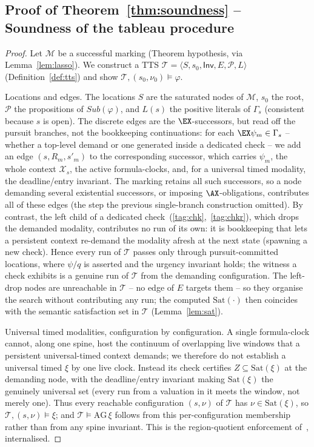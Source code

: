 \subsection{Proof of Theorem~\ref{thm:soundness} -- Soundness of the tableau procedure}

\begin{proof}
Let $\mathcal{M}$ be a successful marking (Theorem hypothesis, via Lemma~\ref{lem:lasso}). We construct a TTS $\mathcal{T}=\langle S,s_0,\mathsf{Inv},E,\mathcal{P},L\rangle$ (Definition~\ref{def:tts}) and show $\mathcal{T},(s_0,\nu_0)\models\varphi$.

{Locations and edges.} The locations $S$ are the saturated nodes of $\mathcal{M}$, $s_0$ the root, $\mathcal{P}$ the propositions of $Sub(\varphi)$, and $L(s)$ the positive literals of $\Gamma_s$ (consistent because $s$ is open). The discrete edges are the $\EX$-successors, but read off the {pursuit} branches, not the bookkeeping continuations: for each $\EX\psi_m\in\Gamma_s$ -- whether a top-level demand or one generated inside a dedicated check -- we add an edge $(s,R_m,s'_m)$ to the corresponding successor, which carries $\psi_m$, the whole context $\mathcal{X}_s$, the active formula-clocks, and, for a universal timed modality, the deadline/entry invariant. The marking retains {all} such successors, so a node demanding several existential successors, or imposing $\AX$-obligations, contributes all of these edges (the step the previous single-branch construction omitted). By contrast, the left child of a dedicated check~(\ref{tag:chk},~\ref{tag:chkr}), which {drops} the demanded modality, contributes {no run of its own}: it is bookkeeping that lets a persistent context re-demand the modality afresh at the next state (spawning a new check). Hence every run of $\mathcal{T}$ passes only through pursuit-committed locations, where $\psi/q$ is asserted and the urgency invariant holds; the witness a check exhibits is a genuine run of $\mathcal{T}$ from the demanding configuration. The left-drop nodes are {unreachable} in $\mathcal{T}$ -- no edge of $E$ targets them -- so they organise the search without contributing any run; the computed $\mathrm{Sat}(\cdot)$ then coincides with the semantic satisfaction set in $\mathcal{T}$ (Lemma~\ref{lem:sat}).

{Universal timed modalities, configuration by configuration.} A single formula-clock cannot, along one spine, host the continuum of overlapping live windows that a persistent universal-timed context demands; we therefore do {not} establish a universal timed $\xi$ by one live clock. Instead its check certifies $Z\subseteq\mathrm{Sat}(\xi)$ at the demanding node, with the deadline/entry invariant making $\mathrm{Sat}(\xi)$ the genuinely {universal} set (every run from a valuation in it meets the window, not merely one). Thus every reachable configuration $(s,\nu)$ of $\mathcal{T}$ has $\nu\in\mathrm{Sat}(\xi)$, so $\mathcal{T},(s,\nu)\models\xi$; and $\mathcal{T}\models\mathrm{AG}\,\xi$ follows from this per-configuration membership rather than from any spine invariant. This is the region-quotient enforcement of~\cite{fsttcs2000-LN,LaTorreNapoli2001TimedTreeAutomata}, internalised.


\end{proof}
